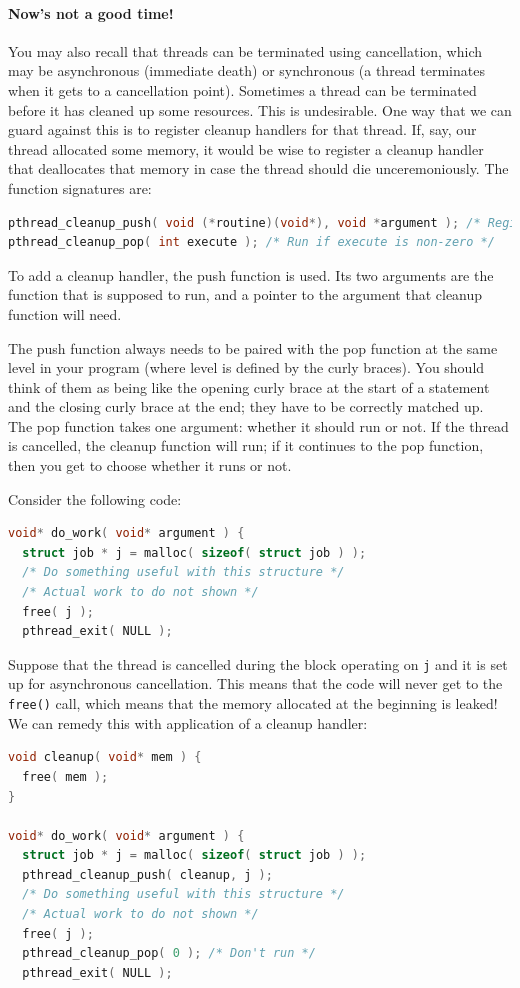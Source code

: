 \documentclass[a4paper]{report}
\begin{document}
\paragraph{Now's not a good time!} You may also recall that threads can be terminated using cancellation, which may be asynchronous (immediate death) or synchronous (a thread terminates when it gets to a cancellation point). Sometimes a thread can be terminated before it has cleaned up some resources. This is undesirable. One way that we can guard against this is to register cleanup handlers for that thread. If, say, our thread allocated some memory, it would be wise to register a cleanup handler that deallocates that memory in case the thread should die unceremoniously. The function signatures are:

\begin{lstlisting}[language=C]
pthread_cleanup_push( void (*routine)(void*), void *argument ); /* Register cleanup handler, with argument */ 
pthread_cleanup_pop( int execute ); /* Run if execute is non-zero */ 
\end{lstlisting}

To add a cleanup handler, the push function is used. Its two arguments are the function that is supposed to run, and a pointer to the argument that cleanup function will need.

The push function always needs to be paired with the pop function at the same level in your program (where level is defined by the curly braces). You should think of them as being like the opening curly brace at the start of a statement and the closing curly brace at the end; they have to be correctly matched up. The pop function takes one argument: whether it should run or not. If the thread is cancelled, the cleanup function will run; if it continues to the pop function, then you get to choose whether it runs or not.

Consider the following code: 
\begin{lstlisting}[language=C]
void* do_work( void* argument ) {
  struct job * j = malloc( sizeof( struct job ) );
  /* Do something useful with this structure */
  /* Actual work to do not shown */
  free( j );
  pthread_exit( NULL );
\end{lstlisting}

Suppose that the thread is cancelled during the block operating on \texttt{j} and it is set up for asynchronous cancellation. This means that the code will never get to the \texttt{free()} call, which means that the memory allocated at the beginning is leaked! We can remedy this with application of a cleanup handler:
\begin{lstlisting}[language=C]
void cleanup( void* mem ) {
  free( mem );
}

void* do_work( void* argument ) {
  struct job * j = malloc( sizeof( struct job ) );
  pthread_cleanup_push( cleanup, j );
  /* Do something useful with this structure */
  /* Actual work to do not shown */
  free( j );
  pthread_cleanup_pop( 0 ); /* Don't run */
  pthread_exit( NULL );
\end{lstlisting}
\end{document}
